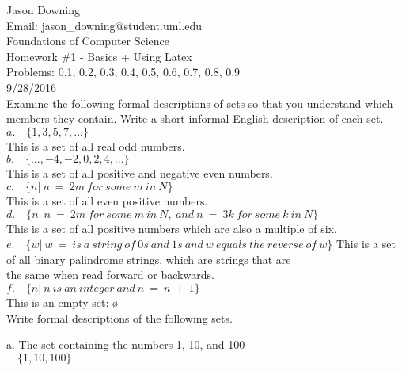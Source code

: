 \documentclass[12pt]{article}
\begin{document}
	
\noindent
Jason Downing \\
Email: jason\_downing@student.uml.edu \\
Foundations of Computer Science \\
Homework \#1 - Basics + Using Latex \\
Problems: 0.1, 0.2, 0.3, 0.4, 0.5, 0.6, 0.7, 0.8, 0.9 \\
9/28/2016 \\

 \quad Examine the following formal descriptions of sets so that you understand which
members they contain. Write a short informal English description of each set. 
\\
\indent
$a. \quad \{1, 3, 5, 7, ...\} $ \\
\indent
This is a set of all real odd numbers. \\

$b. \quad \{...,-4,-2,0,2,4,...\} $ \\
\indent
This is a set of all positive and negative even numbers. \\

$c. \quad \{n |\ n \ = \ 2m \ for \ some \ m \ in \ N\} $ \\
\indent
This is a set of all even positive numbers. \\

$d. \quad \{n |\ n \ = \ 2m \ for \ some \ m \ in \ N, \ 
and \ n \ = \ 3k \ for \ some \ k \ in \ N\} $ \\
\indent
This is a set of all positive numbers which are also a multiple of six. \\

$e. \quad \{w |\ w \ = \ is \ a \ string \ of \ 0s \ 
and \ 1s \ and \ w \ equals \ the \ reverse \ of \ w \} $
\indent
This is a set of all binary palindrome strings, which are strings that are \\
\indent
the same when read forward or backwards. \\

$f. \quad \{n |\ n \ is \ an \ integer \ and \ n \ = \ n \ + \ 1 \} $ \\
\indent
This is an empty set: \o \\

 \quad Write formal descriptions of the following sets.

a. The set containing the numbers 1, 10, and 100 \\
\indent
$ \quad \{1, 10, 100\} $ \\
\end{document}
